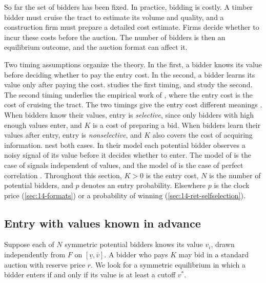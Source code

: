 So far the set of bidders has been fixed. In practice, bidding is costly. A timber bidder must cruise
the tract to estimate its volume and quality, and a construction firm must prepare a detailed cost
estimate. Firms decide whether to incur these costs before the auction. The number of bidders is then
an equilibrium outcome, and the auction format can affect it.

Two timing assumptions organize the theory. In the first, a bidder knows its value before deciding
whether to pay the entry cost. In the second, a bidder learns its value only after paying the cost.
\citet{Samuelson1985} studies the first timing, and \citet{LevinSmith1994} study the second. The
second timing underlies the empirical work of \citet{AtheyLevinSeira2011}, where the entry cost is
the cost of cruising the tract. The two timings give the entry cost different meanings
\citep[Section~2.2, p.~91]{HortacsuPerrigne2021}. When bidders know their values, entry is
\emph{selective}, since only bidders with high enough values enter, and $K$ is a cost of preparing a
bid. When bidders learn their values after entry, entry is \emph{nonselective}, and $K$ also covers
the cost of acquiring information. \citet{RobertsSweeting2016} nest both cases. In their model each
potential bidder observes a noisy signal of its value before it decides whether to enter. The model
of \citet{LevinSmith1994} is the case of signals independent of values, and the model of
\citet{Samuelson1985} is the case of perfect correlation \citep[footnote~9, p.~92]{HortacsuPerrigne2021}.
Throughout this section, $K>0$ is the entry cost, $N$ is the number
of potential bidders, and $p$ denotes an entry probability. Elsewhere $p$ is the clock price
(\cref{sec:14-formats}) or a probability of winning (\cref{sec:14-ret-selfselection}).

\subsection{Entry with values known in advance}\label{sec:14-entry-samuelson}

Suppose each of $N$ symmetric potential bidders knows its value $v_i$, drawn independently from $F$
on $[\underline v,\bar v]$. A bidder who pays $K$ may bid in a standard auction with reserve price
$r$. We look for a symmetric equilibrium in which a bidder enters if and only if its value is at least
a cutoff $v^*$.

